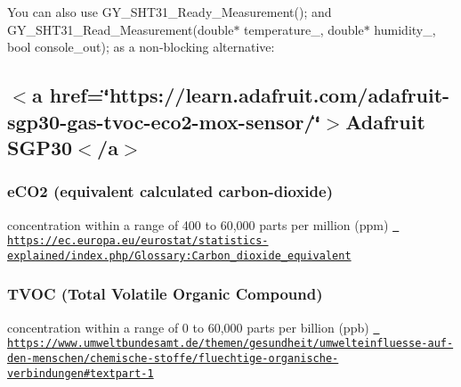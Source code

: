 You can also use {\ttfamily G\+Y\+\_\+\+S\+H\+T31\+\_\+\+Ready\+\_\+\+Measurement();} and {\ttfamily G\+Y\+\_\+\+S\+H\+T31\+\_\+\+Read\+\_\+\+Measurement(double$\ast$ temperature\+\_\+, double$\ast$ humidity\+\_\+, bool console\+\_\+out);} as a non-\/blocking alternative\+: 
\begin{DoxyCode}{0}
\DoxyCodeLine{}
\end{DoxyCode}
\hypertarget{autotoc_md7_autotoc_md20}{}\subsection{$<$a href=\char`\"{}https\+://learn.\+adafruit.\+com/adafruit-\/sgp30-\/gas-\/tvoc-\/eco2-\/mox-\/sensor/\char`\"{}$>$\+Adafruit S\+G\+P30$<$/a$>$}\label{autotoc_md7_autotoc_md20}
\hypertarget{autotoc_md7_autotoc_md21}{}\subsubsection{e\+C\+O2 (equivalent calculated carbon-\/dioxide)}\label{autotoc_md7_autotoc_md21}
concentration within a range of 400 to 60,000 parts per million (ppm) \href{https://ec.europa.eu/eurostat/statistics-explained/index.php/Glossary:Carbon_dioxide_equivalent}{\texttt{ https\+://ec.\+europa.\+eu/eurostat/statistics-\/explained/index.\+php/\+Glossary\+:\+Carbon\+\_\+dioxide\+\_\+equivalent}}\hypertarget{autotoc_md7_autotoc_md22}{}\subsubsection{T\+V\+O\+C (\+Total Volatile Organic Compound)}\label{autotoc_md7_autotoc_md22}
concentration within a range of 0 to 60,000 parts per billion (ppb) \href{https://www.umweltbundesamt.de/themen/gesundheit/umwelteinfluesse-auf-den-menschen/chemische-stoffe/fluechtige-organische-verbindungen\#textpart-1}{\texttt{ https\+://www.\+umweltbundesamt.\+de/themen/gesundheit/umwelteinfluesse-\/auf-\/den-\/menschen/chemische-\/stoffe/fluechtige-\/organische-\/verbindungen\#textpart-\/1}} 